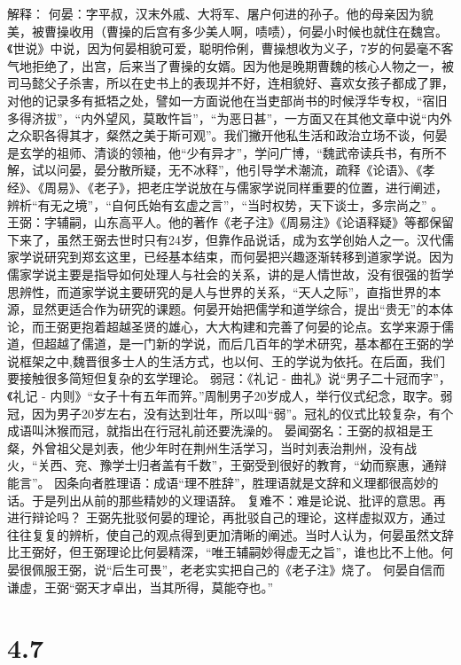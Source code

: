 \documentclass[]{book}
\begin{document}
解释：
何晏：字平叔，汉末外戚、大将军、屠户何进的孙子。他的母亲因为貌美，被曹操收用（曹操的后宫有多少美人啊，啧啧），何晏小时候也就住在魏宫。《世说》中说，因为何晏相貌可爱，聪明伶俐，曹操想收为义子，7岁的何晏毫不客气地拒绝了，出宫，后来当了曹操的女婿。因为他是晚期曹魏的核心人物之一，被司马懿父子杀害，所以在史书上的表现并不好，连相貌好、喜欢女孩子都成了罪，对他的记录多有抵牾之处，譬如一方面说他在当吏部尚书的时候浮华专权，``宿旧多得济拔''，``内外望风，莫敢忤旨''，``为恶日甚''，一方面又在其他文章中说``内外之众职各得其才，粲然之美于斯可观''。我们撇开他私生活和政治立场不谈，何晏是玄学的祖师、清谈的领袖，他``少有异才''，学问广博，``魏武帝读兵书，有所不解，试以问晏，晏分散所疑，无不冰释''，他引导学术潮流，疏释《论语》、《孝经》、《周易》、《老子》，把老庄学说放在与儒家学说同样重要的位置，进行阐述，辨析``有无之境''，``自何氏始有玄虚之言''，``当时权势，天下谈士，多宗尚之''
。
王弼：字辅嗣，山东高平人。他的著作《老子注》《周易注》《论语释疑》等都保留下来了，虽然王弼去世时只有24岁，但靠作品说话，成为玄学创始人之一。汉代儒家学说研究到郑玄这里，已经基本结束，而何晏把兴趣逐渐转移到道家学说。因为儒家学说主要是指导如何处理人与社会的关系，讲的是人情世故，没有很强的哲学思辨性，而道家学说主要研究的是人与世界的关系，``天人之际''，直指世界的本源，显然更适合作为研究的课题。何晏开始把儒学和道学综合，提出``贵无''的本体论，而王弼更抱着超越圣贤的雄心，大大构建和完善了何晏的论点。玄学来源于儒道，但超越了儒道，是一门新的学说，而后几百年的学术研究，基本都在王弼的学说框架之中,魏晋很多士人的生活方式，也以何、王的学说为依托。在后面，我们要接触很多简短但复杂的玄学理论。
弱冠：《礼记 - 曲礼》说``男子二十冠而字''，《礼记 -
内则》``女子十有五年而笄。''周制男子20岁成人，举行仪式纪念，取字。弱冠，因为男子20岁左右，没有达到壮年，所以叫``弱''。冠礼的仪式比较复杂，有个成语叫沐猴而冠，就指出在行冠礼前还要洗澡的。
晏闻弼名：王弼的叔祖是王粲，外曾祖父是刘表，他少年时在荆州生活学习，当时刘表治荆州，没有战火，``关西、兖、豫学士归者盖有千数''，王弼受到很好的教育，``幼而察惠，通辩能言''。
因条向者胜理语：成语``理不胜辞''，胜理语就是文辞和义理都很高妙的话。于是列出从前的那些精妙的义理语辞。
复难不：难是论说、批评的意思。再进行辩论吗？
王弼先批驳何晏的理论，再批驳自己的理论，这样虚拟双方，通过往往复复的辨析，使自己的观点得到更加清晰的阐述。当时人认为，何晏虽然文辞比王弼好，但王弼理论比何晏精深，``唯王辅嗣妙得虚无之旨''，谁也比不上他。何晏很佩服王弼，说``后生可畏''，老老实实把自己的《老子注》烧了。
何晏自信而谦虚，王弼``弼天才卓出，当其所得，莫能夺也。''

\section{4.7}\label{section-187}
\end{document}
